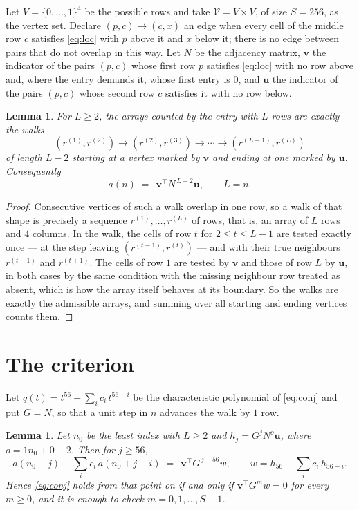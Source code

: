 \documentclass[11pt,a4paper]{article}
\theoremstyle{plain}
\newtheorem{lemma}[theorem]{Lemma}
\theoremstyle{definition}
\begin{document}
Let $V=\{0,\dots,1\}^{4}$ be the possible rows and take
$\mathcal V=V\times V$, of size $S=256$, as the vertex set. Declare $(p,c)\to(c,x)$ an edge
when every cell of the middle row $c$ satisfies \eqref{eq:loc} with $p$ above it and $x$
below it; there is no edge between pairs that do not overlap in this way. Let $N$ be the
adjacency matrix, $\mathbf{v}$ the indicator of the pairs $(p,c)$ whose first row $p$
satisfies \eqref{eq:loc} with no row above and, where the entry demands it, whose first entry is $0$, and $\mathbf{u}$ the indicator of
the pairs $(p,c)$ whose second row $c$ satisfies it with no row below.

\begin{lemma}\label{lem:walk}
For $L\ge2$, the arrays counted by the entry with $L$ rows are exactly the walks
\[
(r^{(1)},r^{(2)})\to(r^{(2)},r^{(3)})\to\cdots\to(r^{(L-1)},r^{(L)})
\]
of length $L-2$ starting at a vertex marked by $\mathbf{v}$ and ending at one marked by
$\mathbf{u}$. Consequently
\[
a(n)\;=\;\,\mathbf{v}^{\!\top}N^{\,L-2}\mathbf{u},\qquad L=n .
\]
\end{lemma}

\begin{proof}
Consecutive vertices of such a walk overlap in one row, so a walk of that shape is
precisely a sequence $r^{(1)},\dots,r^{(L)}$ of rows, that is, an array of $L$ rows
and $4$ columns. In the walk, the cells of row $t$ for $2\le t\le L-1$ are tested
exactly once --- at the step leaving $(r^{(t-1)},r^{(t)})$ --- and with their true
neighbours $r^{(t-1)}$ and $r^{(t+1)}$. The cells of row $1$ are tested by
$\mathbf{v}$ and those of row $L$ by $\mathbf{u}$, in both cases by the same condition
with the missing neighbour row treated as absent, which is how the array itself behaves at
its boundary. So the walks are exactly the admissible arrays, and summing over all starting
and ending vertices counts them.
\end{proof}

\section{The criterion}

Let $q(t)=t^{56}-\sum_i c_i\,t^{56-i}$ be the characteristic polynomial of
\eqref{eq:conj} and put $G=N$, so that a unit step in $n$ advances the walk by
$1$ row.

\begin{lemma}\label{lem:crit}
Let $n_0$ be the least index with $L\ge2$ and $h_j=G^{j}N^{o}\mathbf{u}$, where
$o=1n_0+0-2$. Then for $j\ge56$,
\[
a(n_0+j)-\sum_i c_i\,a(n_0+j-i)\;=\;\,\mathbf{v}^{\!\top}G^{\,j-56}w,
\qquad w=h_{56}-\sum_i c_i\,h_{56-i} .
\]
Hence \eqref{eq:conj} holds from that point on if and only if
$\mathbf{v}^{\!\top}G^{m}w=0$ for every $m\ge0$, and it is enough to check
$m=0,1,\dots,S-1$.
\end{lemma}
\end{document}
